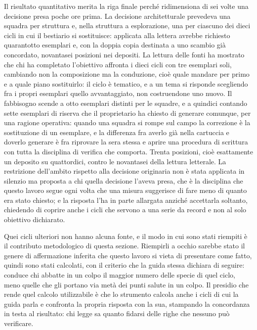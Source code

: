 Il risultato quantitativo merita la riga finale perché ridimensiona di sei volte una decisione presa poche ore prima. La decisione architetturale prevedeva una squadra per struttura e, nella struttura a esplorazione, una per ciascuno dei dieci cicli in cui il bestiario si sostituisce: applicata alla lettera avrebbe richiesto quarantotto esemplari e, con la doppia copia destinata a uno scambio già concordato, novantasei posizioni nei depositi. La lettura delle fonti ha mostrato che chi ha completato l'obiettivo affronta i dieci cicli con tre esemplari soli, cambiando non la composizione ma la conduzione, cioè quale mandare per primo e a quale piano sostituirlo: il ciclo è tematico, e a un tema si risponde scegliendo fra i propri esemplari quello avvantaggiato, non costruendone uno nuovo. Il fabbisogno scende a otto esemplari distinti per le squadre, e a quindici contando sette esemplari di riserva che il proprietario ha chiesto di generare comunque, per una ragione operativa: quando una squadra si rompe sul campo la correzione è la sostituzione di un esemplare, e la differenza fra averlo già nella cartuccia e doverlo generare è fra riprovare la sera stessa e aprire una procedura di scrittura con tutta la disciplina di verifica che comporta. Trenta posizioni, cioè esattamente un deposito su quattordici, contro le novantasei della lettura letterale. La restrizione dell'ambito rispetto alla decisione originaria non è stata applicata in silenzio ma proposta a chi quella decisione l'aveva presa, che è la disciplina che questo lavoro segue ogni volta che una misura suggerisce di fare meno di quanto era stato chiesto; e la risposta l'ha in parte allargata anziché accettarla soltanto, chiedendo di coprire anche i cicli che servono a una serie da record e non al solo obiettivo dichiarato.

Quei cicli ulteriori non hanno alcuna fonte, e il modo in cui sono stati riempiti è il contributo metodologico di questa sezione. Riempirli a occhio sarebbe stato il genere di affermazione inferita che questo lavoro si vieta di presentare come fatto, quindi sono stati calcolati, con il criterio che la guida stessa dichiara di seguire: conduce chi abbatte in un colpo il maggior numero delle specie di quel ciclo, meno quelle che gli portano via metà dei punti salute in un colpo. Il presidio che rende quel calcolo utilizzabile è che lo strumento calcola anche i cicli di cui la guida parla e confronta la propria risposta con la sua, stampando la concordanza in testa al risultato: chi legge sa quanto fidarsi delle righe che nessuno può verificare.

